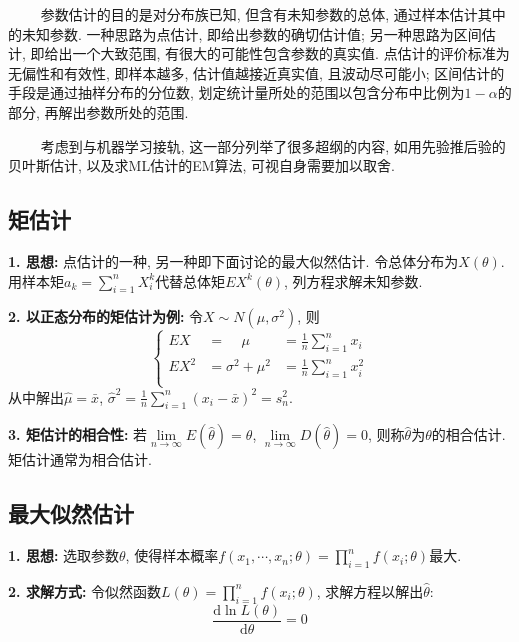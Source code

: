 \begin{tcolorbox}[colback=red!5,colframe=red!75!black]
    ~~~~ 参数估计的目的是对分布族已知, 但含有未知参数的总体, 通过样本估计其中的未知参数. 一种思路为点估计, 即给出参数的确切估计值; 另一种思路为区间估计, 即给出一个大致范围, 有很大的可能性包含参数的真实值. 点估计的评价标准为无偏性和有效性, 即样本越多, 估计值越接近真实值, 且波动尽可能小; 
    区间估计的手段是通过抽样分布的分位数, 划定统计量所处的范围以包含分布中比例为$1-\alpha$的部分, 再解出参数所处的范围.

    ~~~~ 考虑到与机器学习接轨, 这一部分列举了很多超纲的内容, 如用先验推后验的贝叶斯估计, 以及求ML估计的EM算法, 可视自身需要加以取舍.
\end{tcolorbox}

\subsection{矩估计}

\textbf{1. 思想: }点估计的一种, 另一种即下面讨论的最大似然估计. 令总体分布为$X(\theta)$. 用样本矩$a_k=\sum\limits_{i=1}^n X_i^k$代替总体矩$EX^k(\theta)$, 列方程求解未知参数.

\textbf{2. 以正态分布的矩估计为例: }令$X \sim N(\mu,\sigma^2)$, 则
\begin{equation*}
    \left\{\begin{aligned}
        EX &=~~~~~\mu&=\frac{1}{n}\sum\limits_{i=1}^n x_i\\
        EX^2 &=\sigma^2+\mu^2&=\frac{1}{n}\sum\limits_{i=1}^n x_i^2\\
    \end{aligned}\right.
\end{equation*}
从中解出$\hat{\mu}=\bar{x}$, $\hat{\sigma}^2=\frac{1}{n}\sum\limits_{i=1}^n(x_i-\bar{x})^2 =s_n^2$.

\textbf{3. 矩估计的相合性: }若$\lim\limits_{n\rightarrow \infty} E(\hat{\theta})=\theta$, $\lim\limits_{n\rightarrow \infty} D(\hat{\theta})=0$, 则称$\hat{\theta}$为$\theta$的相合估计. 矩估计通常为相合估计.

\subsection{最大似然估计}

\textbf{1. 思想: }选取参数$\theta$, 使得样本概率$f(x_1,\cdots,x_n;\theta)=\prod\limits_{i=1}^n f(x_i;\theta)$最大.

\textbf{2. 求解方式: }令似然函数$L(\theta)=\prod\limits_{i=1}^n f(x_i;\theta)$, 求解方程以解出$\hat{\theta}$:
\begin{equation*}
    \frac{\mathrm{d}\ln L(\theta)}{\mathrm{d}\theta}=0
\end{equation*}

